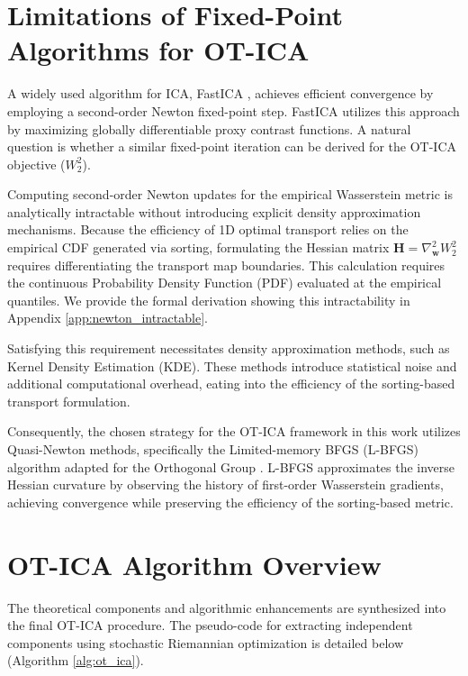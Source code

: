 \documentclass[12pt,a4paper,twoside,openany]{book}
\begin{document}
\section{Limitations of Fixed-Point Algorithms for OT-ICA}
A widely used algorithm for ICA, FastICA \cite[Chapter 8]{hyvarinen2001}, achieves efficient convergence by employing a second-order Newton fixed-point step. 
FastICA utilizes this approach by maximizing globally differentiable proxy contrast functions. 
A natural question is whether a similar fixed-point iteration can be derived for the OT-ICA objective ($W_2^2$). 

Computing second-order Newton updates for the empirical Wasserstein metric is analytically intractable without introducing explicit density approximation mechanisms. 
Because the efficiency of 1D optimal transport relies on the empirical CDF generated via sorting, formulating the 
Hessian matrix $\mathbf{H} = \nabla^2_{\mathbf{w}} W_2^2$ requires differentiating the transport map boundaries. 
This calculation requires the continuous Probability Density Function (PDF) evaluated at the empirical quantiles. 
We provide the formal derivation showing this intractability in Appendix \ref{app:newton_intractable}.

Satisfying this requirement necessitates density approximation methods, such as Kernel Density Estimation (KDE). 
These methods introduce statistical noise and additional computational overhead, eating into the efficiency of the sorting-based transport formulation.

Consequently, the chosen strategy for the OT-ICA framework in this work utilizes Quasi-Newton methods, specifically the Limited-memory BFGS (L-BFGS) algorithm \cite{liu1989limited} 
adapted for the Orthogonal Group \cite[Chapter 6]{absil2008optimization}. L-BFGS approximates the inverse Hessian curvature by observing 
the history of first-order Wasserstein gradients, achieving convergence while preserving the efficiency of the sorting-based metric.

\section{OT-ICA Algorithm Overview}
The theoretical components and algorithmic enhancements are synthesized into the final OT-ICA procedure. 
The pseudo-code for extracting independent components using stochastic Riemannian optimization is detailed below (Algorithm \ref{alg:ot_ica}).
\end{document}
